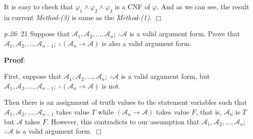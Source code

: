 \documentclass[UTF8,12pt,a4paper]{ctexart}
\begin{document}
It is easy to check that  $\varphi_1 \land \varphi_2 \land \varphi_3$ is a CNF of $\varphi$. 
And as we can see, the result in current \textit{Method-(3)} is same as the  \textit{Method-(1)}. 
\hfill $\Box$



\vspace{3em}

\emph{p.26}: 21 \quad
Suppose that $\mathscr{A}_1,\mathscr{A}_2,\dots,\mathscr{A}_n$;  $\therefore\mathscr{A}$ is a valid argument form. Prove that $\mathscr{A}_1,\mathscr{A}_2,\dots,\mathscr{A}_{n-1}$;  $\therefore (\mathscr{A}_n \to \mathscr{A})$ is also a valid argument form.

\noindent\textbf{Proof}:

First, suppose that $\mathscr{A}_1,\mathscr{A}_2,\dots,\mathscr{A}_n$;  $\therefore\mathscr{A}$ is a valid argument form, but $\mathscr{A}_1,\mathscr{A}_2,\dots,\mathscr{A}_{n-1}$;  $\therefore (\mathscr{A}_n \to \mathscr{A})$ is not. 

Then there is an assignment of truth values to the statement variables such that 
$\mathscr{A}_1,\mathscr{A}_2,\dots,\mathscr{A}_{n-1}$ takes value $T$ 
while $(\mathscr{A}_n \to \mathscr{A})$ takes value $F$, that is, 
$\mathscr{A}_n $ is $T$ but $\mathscr{A}$ takes $F$. 
However, this contradicts to our assumption that $\mathscr{A}_1,\mathscr{A}_2,\dots,\mathscr{A}_n$;  $\therefore\mathscr{A}$ is a valid argument form.
\hfill $\Box$
\end{document}
